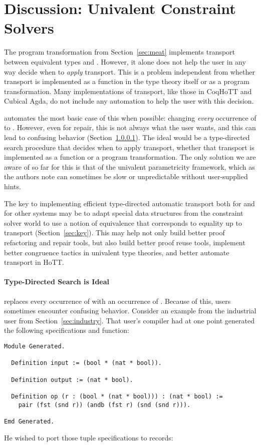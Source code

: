 \section{Discussion: Univalent Constraint Solvers}

The program transformation from Section~\ref{sec:meat} implements transport between equivalent types \A and \B.
However, it alone does not help the user in any way decide when to \textit{apply} transport.
This is a problem independent from whether transport is implemented as a function in the type theory itself
or as a program transformation.
Many implementations of transport, like those in CoqHoTT and Cubical Agda, %
do not include any automation to help the user with this decision.

\toolname automates the most basic case of this when possible: changing \textit{every} occurrence of \A to \B.
However, even for repair, this is not always what the user wants, and this can lead to confusing behavior (Section~\ref{sec:ideal}).
The ideal would be a type-directed search procedure that decides when to apply transport,
whether that transport is implemented as a function or a program transformation.
The only solution we are aware of so far for this is that of the univalent parametricity framework,
which as the authors note can sometimes be slow or unpredictable without user-supplied hints.

The key to implementing efficient type-directed automatic transport both for \toolname
and for other systems may be to adapt special data structures from the constraint solver world to use a
notion of equivalence that corresponds to equality up to transport (Section~\ref{sec:key}).
This may help not only build better proof refactoring and repair tools, but also build better proof reuse tools,
implement better congruence tactics in univalent type theories, and better automate transport in HoTT.

\paragraph{Type-Directed Search is Ideal}
\label{sec:ideal}

\toolname replaces every occurrence of \A with an occurrence of \B.
Because of this, users sometimes encounter confusing behavior.
Consider an example from the industrial user from Section~\ref{sec:industry}.
That user's compiler had at one point generated the following specifications and function:

\begin{lstlisting}
Module Generated.

  Definition input := (bool * (nat * bool)).

  Definition output := (nat * bool).

  Definition op (r : (bool * (nat * bool))) : (nat * bool) :=
    pair (fst (snd r)) (andb (fst r) (snd (snd r))).

Emd Generated.
\end{lstlisting}
He wished to port those tuple specifications to records:

